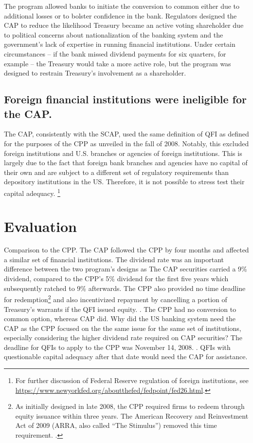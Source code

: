 \documentclass[12pt]{article}
\begin{document}
The program allowed banks to initiate the conversion to common either due to additional losses or to bolster confidence in the bank. Regulators designed the CAP to reduce the likelihood Treasury became an active voting shareholder due to political concerns about nationalization of the banking system and the government's lack of expertise in running financial institutions. Under certain circumstances -- if the bank missed dividend payments for six quarters, for example -- the Treasury would take a more active role, but the program was designed to restrain Treasury's involvement as a shareholder.

\subsection{Foreign financial institutions were ineligible for the CAP.}

The CAP, consistently with the SCAP, used the same definition of QFI as defined for the purposes of the CPP as unveiled in the fall of 2008. Notably, this excluded foreign institutions and U.S. branches or agencies of foreign institutions. This is largely due to the fact that foreign bank branches and agencies have no capital of their own and are subject to a different set of regulatory requirements than depository institutions in the US. Therefore, it is not possible to stress test their capital adequacy. \footnote{For further discussion of Federal Reserve regulation of foreign institutions, see \url{https://www.newyorkfed.org/aboutthefed/fedpoint/fed26.html}.}

\section{Evaluation}

Comparison to the CPP. The CAP followed the CPP by four months and affected a similar set of financial institutions. The dividend rate was an important difference between the two program's designs as The CAP securities carried a 9\% dividend, compared to the CPP's 5\% dividend for the first five years which subsequently ratched to 9\% afterwards. The CPP also provided no time deadline for redemption\footnote{As initially designed in late 2008, the CPP required firms to redeem through equity issuance within three years. The American Recovery and Reinvestment Act of 2009 (ARRA, also called “The Stimulus”) removed this time requirement. \citep{GW}.} and also incentivized repayment by cancelling a portion of Treasury's warrants if the QFI issued equity. \citep{GW}. The CPP had no conversion to common option, whereas CAP did. Why did the US banking system need the CAP as the CPP focused on the the same issue for the same set of institutions, especially considering the higher dividend rate required on CAP securities? The deadline for QFIs to apply to the CPP was November 14, 2008. \citep{CPPFaq}. QFIs with questionable capital adequacy after that date would need the CAP for assistance.
\end{document}

